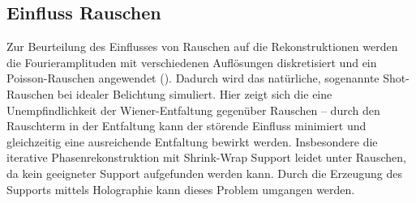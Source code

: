 \subsection{Einfluss Rauschen}
Zur Beurteilung des Einflusses von Rauschen auf die Rekonstruktionen werden die Fourieramplituden mit verschiedenen Auflösungen diskretisiert und ein Poisson-Rauschen angewendet (). Dadurch wird das natürliche, sogenannte Shot-Rauschen bei idealer Belichtung simuliert. Hier zeigt sich die eine Unempfindlichkeit der Wiener-Entfaltung gegenüber Rauschen -- durch den Rauschterm in der Entfaltung kann der störende Einfluss minimiert und gleichzeitig eine ausreichende Entfaltung bewirkt werden. Insbesondere die iterative Phasenrekonstruktion mit Shrink-Wrap Support leidet unter Rauschen, da kein geeigneter Support aufgefunden werden kann. Durch die Erzeugung des Supports mittels Holographie kann dieses Problem umgangen werden.
